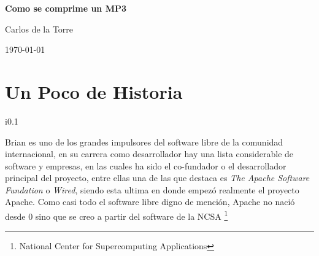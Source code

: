 \documentclass[
paper=128mm:96mm, %
fontsize=11pt, %
pagesize, %
parskip=half-, %
]{scrartcl} %
\newcommand*{\mytitle}{Como se comprime un MP3} %
\newcommand*{\myauthor}{Carlos de la Torre} %
\newcommand*{\mydate}{\today} %
\begin{document}

\thispagestyle{empty} %
\begin{flushright}
\vspace{0.6cm}
\color{white}\sffamily
{\bfseries\Large\mytitle\par} %
\vspace{0.5cm}
\normalsize
\myauthor\par %
\mydate\par %
\vfill
\end{flushright}
\setcounter{page}{0}
\clearpage

\section{Un Poco de Historia \cite{Historia1}}
\begin{wrapfigure}{i}{0.1\textwidth}
  \vspace{-25pt}
  \begin{center}
  \end{center}
  \vspace{-25pt}
\end{wrapfigure}
Brian es uno de los grandes impulsores del software libre de la comunidad internacional, en su carrera como desarrollador hay una lista considerable de software y empresas, en las cuales ha sido el co-fundador o el desarrollador principal del proyecto, entre ellas una de las que destaca es \emph{The Apache Software Fundation} o \emph{Wired}, siendo esta ultima en donde empezó realmente el proyecto Apache. Como casi todo el software libre digno de mención, Apache no nació desde 0 sino que se creo a partir del software de la NCSA \footnote{National Center for Supercomputing Applications}
\clearpage
\end{document}
